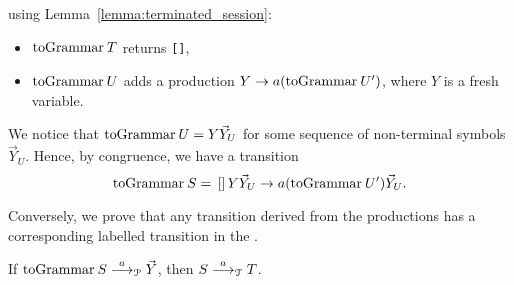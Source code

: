 \begin{itemizeproof}
\begin{itemize}
  using Lemma~\ref{lemma:terminated_session}:
  \begin{itemize}
  \item $\toGrammarf T$  returns \lstinline{[]},
  \item $\toGrammarf U$ adds a production
    $Y \rightarrow a (\toGrammarf U')$, where $Y$ is a fresh
    variable.
  \end{itemize}
  We notice that $\toGrammarf U = Y\vec Y_U$ for some sequence of
  non-terminal symbols $\vec Y_U$. Hence, by congruence, we have a
  transition
  \[\toGrammarf S = \text{\lstinline{[]}} Y
    \vec Y_U \rightarrow a (\toGrammarf{U')} \vec Y_U.\]
\end{itemize}
\end{itemizeproof}

Conversely, we prove that any transition derived from the productions
has a corresponding labelled transition in the \LTS.

\begin{lemma}
  \label{lem:prod-to-type}
  If $\toGrammarf S \LTSderivesP \vec Y$, then $S\stackrel{a}{\longrightarrow}_\mathcal T
  T$.\\ 
\end{lemma}

